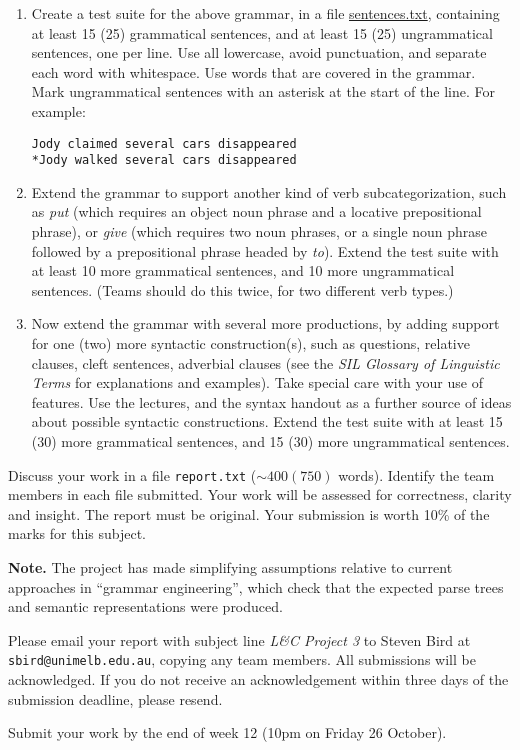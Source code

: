 \documentclass[a4paper,10pt]{article}
\begin{document}
\begin{enumerate}
\item Create a test suite for the above grammar, in a file
\url{sentences.txt}, containing at least 15 (25) grammatical sentences, and at least
15 (25) ungrammatical sentences, one per line.  Use all lowercase, avoid
punctuation, and separate each word with whitespace.   Use words that
are covered in the grammar.
Mark ungrammatical sentences with an asterisk
at the start of the line.  For example:

\begin{verbatim}
Jody claimed several cars disappeared
*Jody walked several cars disappeared
\end{verbatim}

\item Extend the grammar to support another kind of verb subcategorization,
such as \emph{put} (which requires an object noun phrase and a locative
prepositional phrase), or \emph{give} (which requires two noun phrases, or a
single noun phrase followed by a prepositional phrase headed by \emph{to}).
Extend the test suite with at least 10 more grammatical sentences, and 10 more
ungrammatical sentences. (Teams should do this twice, for two different verb types.)

\item Now extend the grammar with several more productions, by adding support
for one (two) more syntactic construction(s), such as
questions, relative clauses, cleft sentences, adverbial clauses
(see the \emph{SIL Glossary of Linguistic Terms} for explanations
and examples).  Take special care with your use of features.
Use the lectures, and the syntax handout
as a further source of ideas about possible syntactic constructions.  Extend the
test suite with at least 15 (30) more grammatical sentences, and 15 (30) more ungrammatical sentences.

\end{enumerate}

Discuss your work in a file \verb|report.txt| ($\sim 400 (750)$ words).
Identify the team members in each file submitted.
Your work will be assessed for correctness, clarity and insight. 
The report must be original.
Your submission is worth 10\% of the marks for this subject.

\textbf{Note.}  The project has made simplifying assumptions
relative to current approaches in ``grammar engineering'',
which check that the expected parse trees and semantic
representations were produced.

Please email your report with subject line
\textit{L\&C Project 3}
to Steven Bird at \texttt{sbird@unimelb.edu.au},
copying any team members.  All submissions will be acknowledged.
If you do not receive an acknowledgement within three days of the submission deadline, please resend.

Submit your work by the end of week 12 (10pm on Friday 26 October).
\end{document}
